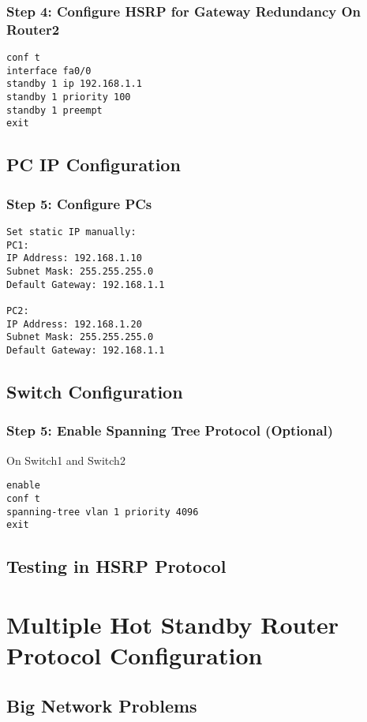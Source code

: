 \documentclass[12pt]{report}
\begin{document}
\subsection*{Step 4: Configure HSRP for Gateway Redundancy On Router2}
\begin{Verbatim}[fontsize=\small, formatcom=\hackfont\color{black}, frame=single]
conf t
interface fa0/0
standby 1 ip 192.168.1.1
standby 1 priority 100
standby 1 preempt
exit
\end{Verbatim}

\section{PC IP Configuration}
\subsection*{Step 5: Configure PCs}
\begin{Verbatim}[fontsize=\small, formatcom=\hackfont\color{black}]
Set static IP manually:
PC1: 
IP Address: 192.168.1.10 
Subnet Mask: 255.255.255.0
Default Gateway: 192.168.1.1

PC2:
IP Address: 192.168.1.20
Subnet Mask: 255.255.255.0
Default Gateway: 192.168.1.1
\end{Verbatim}

\section{Switch Configuration}
\subsection*{Step 5: Enable Spanning Tree Protocol (Optional)}
On Switch1 and Switch2
\begin{Verbatim}[fontsize=\small, formatcom=\hackfont\color{black}, frame=single]
enable
conf t
spanning-tree vlan 1 priority 4096
exit
\end{Verbatim}

\newpage

\section{Testing in HSRP Protocol} 

\chapter{Multiple Hot Standby Router Protocol Configuration}
\section{Big Network Problems}
\end{document}
